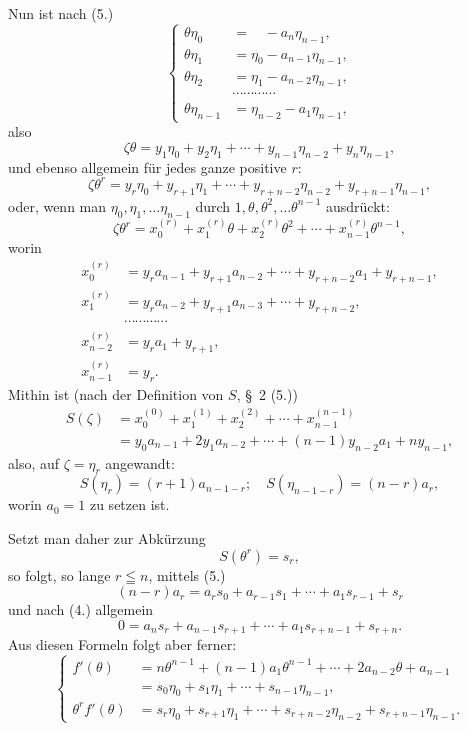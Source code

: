 \documentclass{article}
\begin{document}
Nun ist nach (5.)
\[ \left\{ \begin{aligned} \theta\eta_{0} &= \phantom{\eta_{0}} - a_{n}\eta_{n-1}, \\ \theta\eta_{1} &= \eta_{0} - a_{n-1}\eta_{n-1}, \\ \theta\eta_{2} &= \eta_{1} - a_{n-2}\eta_{n-1}, \\ &\cdots\cdots\cdots\cdots \\ \theta\eta_{n-1} &= \eta_{n-2} - a_{1}\eta_{n-1}, \end{aligned} \right. \tag{7.} \]
also
\[ \zeta\theta = y_{1}\eta_{0} + y_{2}\eta_{1} + \cdots + y_{n-1}\eta_{n-2} + y_{n}\eta_{n-1}, \]
und ebenso allgemein für jedes ganze positive $r$:
\[ \zeta\theta^{r} = y_{r}\eta_{0} + y_{r+1}\eta_{1} + \cdots + y_{r+n-2}\eta_{n-2} + y_{r+n-1}\eta_{n-1}, \]
oder, wenn man $\eta_{0}, \eta_{1}, \ldots \eta_{n-1}$ durch $1, \theta, \theta^{2}, \ldots \theta^{n-1}$ ausdrückt:
\[ \zeta\theta^{r} = x_{0}^{(r)} + x_{1}^{(r)}\theta + x_{2}^{(r)}\theta^{2} + \cdots + x_{n-1}^{(r)}\theta^{n-1}, \]
worin
\[ \begin{aligned} x_{0}^{(r)} &= y_{r}a_{n-1} + y_{r+1}a_{n-2} + \cdots + y_{r+n-2}a_{1} + y_{r+n-1}, \\ x_{1}^{(r)} &= y_{r}a_{n-2} + y_{r+1}a_{n-3} + \cdots + y_{r+n-2}, \\ &\cdots\cdots\cdots\cdots \\ x_{n-2}^{(r)} &= y_{r}a_{1} + y_{r+1}, \\ x_{n-1}^{(r)} &= y_{r}. \end{aligned} \]
Mithin ist (nach der Definition von $S$, §~2 (5.))
\[ \begin{aligned} S(\zeta) &= x_{0}^{(0)} + x_{1}^{(1)} + x_{2}^{(2)} + \cdots + x_{n-1}^{(n-1)} \\ &= y_{0}a_{n-1} + 2y_{1}a_{n-2} + \cdots + (n-1)y_{n-2}a_{1} + ny_{n-1}, \end{aligned} \]
also, auf $\zeta = \eta_{r}$ angewandt:
\[ S(\eta_{r}) = (r+1)a_{n-1-r}; \quad S(\eta_{n-1-r}) = (n-r)a_{r}, \]
worin $a_{0} = 1$ zu setzen ist.

Setzt man daher zur Abkürzung
\[ S(\theta^{r}) = s_{r}, \]
so folgt, so lange $r \leqq n$, mittels (5.)
\[ (n-r)a_{r} = a_{r}s_{0} + a_{r-1}s_{1} + \cdots + a_{1}s_{r-1} + s_{r} \tag{8.} \]
und nach (4.) allgemein
\[ 0 = a_{n}s_{r} + a_{n-1}s_{r+1} + \cdots + a_{1}s_{r+n-1} + s_{r+n}. \tag{9.} \]
Aus diesen Formeln folgt aber ferner:
\[ \left\{ \begin{aligned} f'(\theta) &= n\theta^{n-1} + (n-1)a_{1}\theta^{n-1} + \cdots + 2a_{n-2}\theta + a_{n-1} \\ &= s_{0}\eta_{0} + s_{1}\eta_{1} + \cdots + s_{n-1}\eta_{n-1}, \\ \theta^{r}f'(\theta) &= s_{r}\eta_{0} + s_{r+1}\eta_{1} + \cdots + s_{r+n-2}\eta_{n-2} + s_{r+n-1}\eta_{n-1}. \end{aligned} \right. \tag{10.} \]
\end{document}
